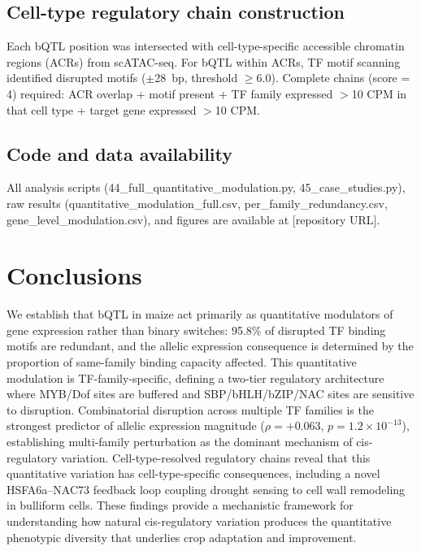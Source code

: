 \documentclass[11pt,a4paper]{article}
\begin{document}
\subsection{Cell-type regulatory chain construction}

Each bQTL position was intersected with cell-type-specific accessible chromatin regions (ACRs) from scATAC-seq. For bQTL within ACRs, TF motif scanning identified disrupted motifs ($\pm$28~bp, threshold $\geq$6.0). Complete chains (score = 4) required: ACR overlap + motif present + TF family expressed $>$10 CPM in that cell type + target gene expressed $>$10 CPM.

\subsection{Code and data availability}

All analysis scripts (44\_full\_quantitative\_modulation.py, 45\_case\_studies.py), raw results (quantitative\_modulation\_full.csv, per\_family\_redundancy.csv, gene\_level\_modulation.csv), and figures are available at [repository URL].

\section{Conclusions}

We establish that bQTL in maize act primarily as quantitative modulators of gene expression rather than binary switches: 95.8\% of disrupted TF binding motifs are redundant, and the allelic expression consequence is determined by the proportion of same-family binding capacity affected. This quantitative modulation is TF-family-specific, defining a two-tier regulatory architecture where MYB/Dof sites are buffered and SBP/bHLH/bZIP/NAC sites are sensitive to disruption. Combinatorial disruption across multiple TF families is the strongest predictor of allelic expression magnitude ($\rho = +0.063$, $p = 1.2 \times 10^{-13}$), establishing multi-family perturbation as the dominant mechanism of cis-regulatory variation. Cell-type-resolved regulatory chains reveal that this quantitative variation has cell-type-specific consequences, including a novel HSFA6a--NAC73 feedback loop coupling drought sensing to cell wall remodeling in bulliform cells. These findings provide a mechanistic framework for understanding how natural cis-regulatory variation produces the quantitative phenotypic diversity that underlies crop adaptation and improvement.
\end{document}
